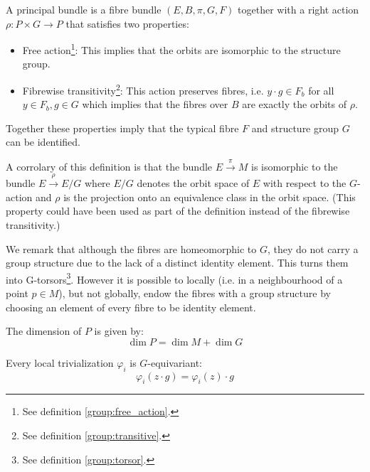 	\begin{definition}
		A principal bundle is a fibre bundle $(E, B, \pi, G, F)$ together with a right action $\rho:P\times G\rightarrow P$ that satisfies two properties:
		\begin{itemize}
			\item Free action\footnote{See definition \ref{group:free_action}.}: This implies that the orbits are isomorphic to the structure group.
			\item Fibrewise transitivity\footnote{See definition \ref{group:transitive}.}: This action preserves fibres, i.e. $y\cdot g\in F_b$ for all $y\in F_b, g\in G$ which implies that the fibres over $B$ are exactly the orbits of $\rho$.
		\end{itemize}
		Together these properties imply that the typical fibre $F$ and structure group $G$ can be identified.
	\end{definition}
	\begin{property}
		A corrolary of this definition is that the bundle $E\xrightarrow{\pi}M$ is isomorphic to the bundle $E\xrightarrow{\rho}E/G$ where $E/G$ denotes the orbit space of $E$ with respect to the $G$-action and $\rho$ is the projection onto an equivalence class in the orbit space. (This property could have been used as part of the definition instead of the fibrewise transitivity.)
	\end{property}
	\begin{remark}
		We remark that although the fibres are homeomorphic to $G$, they do not carry a group structure due to the lack of a distinct identity element. This turns them into G-torsors\footnote{See definition \ref{group:torsor}.}. However it is possible to locally (i.e. in a neighbourhood of a point $p\in M$), but not globally, endow the fibres with a group structure by choosing an element of every fibre to be identity element.
	\end{remark}
	
	\begin{property}
		The dimension of $P$ is given by:
		\begin{equation}
			\label{manifolds:principal_bundle_dimension}
			\dim P = \dim M + \dim G
		\end{equation}
	\end{property}

	\begin{property}
		Every local trivialization $\varphi_i$ is $G$-equivariant:
		\begin{equation}
			\varphi_i(z\cdot g) = \varphi_i(z)\cdot g
		\end{equation}
	\end{property}
	
